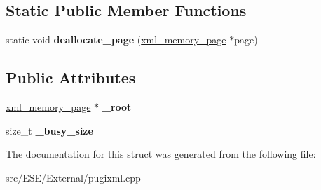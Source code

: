 \subsection*{Static Public Member Functions}
\begin{DoxyCompactItemize}
\item 
\hypertarget{structxml__allocator_a1c6bfe15a257a094f55659f8d71c209e}{static void {\bfseries deallocate\-\_\-page} (\hyperlink{structxml__memory__page}{xml\-\_\-memory\-\_\-page} $\ast$page)}\label{structxml__allocator_a1c6bfe15a257a094f55659f8d71c209e}

\end{DoxyCompactItemize}
\subsection*{Public Attributes}
\begin{DoxyCompactItemize}
\item 
\hypertarget{structxml__allocator_a38082e85b23743620a257f997a00bb69}{\hyperlink{structxml__memory__page}{xml\-\_\-memory\-\_\-page} $\ast$ {\bfseries \-\_\-root}}\label{structxml__allocator_a38082e85b23743620a257f997a00bb69}

\item 
\hypertarget{structxml__allocator_a4908b4aaa8cbbc3bf936ab8a938053c0}{size\-\_\-t {\bfseries \-\_\-busy\-\_\-size}}\label{structxml__allocator_a4908b4aaa8cbbc3bf936ab8a938053c0}

\end{DoxyCompactItemize}


The documentation for this struct was generated from the following file\-:\begin{DoxyCompactItemize}
\item 
src/\-E\-S\-E/\-External/pugixml.\-cpp\end{DoxyCompactItemize}
